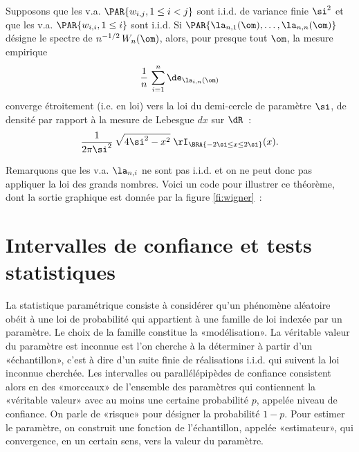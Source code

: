 \begin{thm}[Wigner]
  Supposons que les v.a. $\PAR{w_{i,j},1\leq i<j}$ sont i.i.d. de variance finie
  $\si^2$ et que les v.a. $\PAR{w_{i,i},1\leq i}$ sont i.i.d.  Si
  $\PAR{\la_{n,1}(\om),\ldots,\la_{n,n}(\om)}$ désigne le spectre de
  $n^{-1/2}\,W_n(\om)$, alors, pour presque tout $\om$, la mesure empirique
  $$
  \frac{1}{n}\,\sum_{i=1}^n\de_{\la_{i,n}(\om)}
  $$
  converge étroitement (i.e. en loi) vers la loi du demi-cercle de
  paramètre $\si$, de densité par rapport à la mesure de Lebesgue $dx$ sur $\dR$~:
  $$
  \frac{1}{2\pi\si^2}\,\sqrt{4\si^2-x^2}\;\rI_{\BRA{-2\si\leq x \leq 2\si}}(x).
  $$
\end{thm}
Remarquons que les v.a. $\la_{n,i}$ ne sont pas i.i.d. et on ne peut donc pas
appliquer la loi des grands nombres. Voici un code \ML{} pour illustrer ce
théorème, dont la sortie graphique est donnée par la figure \ref{fi:wigner}~:
%
%
%

%
\chapter{Intervalles de confiance et tests statistiques}
\label{ch:ic+tests}
%
%


La statistique paramétrique consiste à considérer qu'un phénomène aléatoire
obéit à une loi de probabilité qui appartient à une famille de loi indexée par
un paramètre. Le choix de la famille constitue la «modélisation». La véritable
valeur du paramètre est inconnue est l'on cherche à la déterminer à partir
d'un «échantillon», c'est à dire d'un suite finie de réalisations i.i.d. qui
suivent la loi inconnue cherchée. Les intervalles ou parallélépipèdes de
confiance consistent alors en des «morceaux» de l'ensemble des paramètres qui
contiennent la «véritable valeur» avec au moins une certaine probabilité $p$,
appelée niveau de confiance.  On parle de «risque» pour désigner la
probabilité $1-p$. Pour estimer le paramètre, on construit une fonction de
l'échantillon, appelée «estimateur», qui convergence, en un certain sens, vers
la valeur du paramètre.

